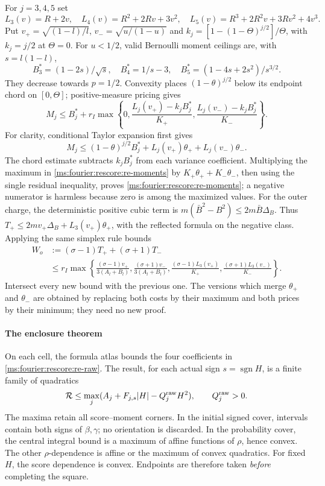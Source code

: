 For $j=3,4,5$ set
\[
 L_3(v)=R+2v,\quad L_4(v)=R^2+2Rv+3v^2,
 \quad L_5(v)=R^3+2R^2v+3Rv^2+4v^3.
\]
Put $v_+=\sqrt{(1-l)/l}$, $v_-=\sqrt{u/(1-u)}$ and
$k_j=[1-(1-\Theta)^{j/2}]/\Theta$, with $k_j=j/2$ at $\Theta=0$.
For $u<1/2$, valid Bernoulli moment ceilings are, with $s=l(1-l)$,
\[
 B_3^*=(1-2s)/\sqrt s,\quad B_4^*=1/s-3,
 \quad B_5^*=(1-4s+2s^2)/s^{3/2}.
\]
They decrease towards $p=1/2$. Convexity places $(1-\theta)^{j/2}$
below its endpoint chord on $[0,\Theta]$; positive-measure pricing gives
\begin{equation}\label{ms:fourier:rescore:re-moments}
 M_j\le B_j^*+r_I\max\left\{0,
 \frac{L_j(v_+)-k_jB_j^*}{K_+},
 \frac{L_j(v_-)-k_jB_j^*}{K_-}\right\}.
\end{equation}
For clarity, conditional Taylor expansion first gives
\[
 M_j\le(1-\theta)^{j/2}B_j^*
               +L_j(v_+)\theta_++L_j(v_-)\theta_-.
\]
The chord estimate subtracts $k_jB_j^*$ from each variance coefficient.
Multiplying the maximum in \eqref{ms:fourier:rescore:re-moments} by
$K_+\theta_++K_-\theta_-$, then using the single residual inequality,
proves \eqref{ms:fourier:rescore:re-moments}; a negative numerator is harmless because zero
is among the maximized values. For the outer charge, the deterministic
positive cubic term is
$m(\bar B^2-B^2)\le2m\bar B\Delta_B$.
Thus $T_+\le2mv_+\Delta_B+L_3(v_+)\theta_+$, with the reflected
formula on the negative class. Applying the same simplex rule bounds
\begin{equation}\label{ms:fourier:rescore:re-outerresource}
\begin{aligned}
 W_o&:=(\sigma-1)T_++(\sigma+1)T_-\\
 &\le r_I\max\left\{
 \frac{(\sigma-1)v_+}{3(A_l+B_l)},
 \frac{(\sigma+1)v_-}{3(A_l+B_l)},
 \frac{(\sigma-1)L_3(v_+)}{K_+},
 \frac{(\sigma+1)L_3(v_-)}{K_-}\right\}.
\end{aligned}
\end{equation}
Intersect every new bound with the previous one. The versions which
merge $\theta_+$ and $\theta_-$ are obtained by replacing both costs by
their maximum and both prices by their minimum; they need no new proof.

\paragraph{The enclosure theorem}\label{ms:fourier:rescore:re-operator}
On each cell, the formula atlas bounds the four coefficients in
\eqref{ms:fourier:rescore:re-raw}. The result, for each actual sign $s=\operatorname{sgn}H$,
is a finite family of quadratics
\begin{equation}\label{ms:fourier:rescore:re-quadratics}
 \mathcal R\le\max_j(A_j+F_{j,s}|H|-Q_j^{\rm raw}H^2),
 \qquad Q_j^{\rm raw}>0.
\end{equation}
The maxima retain all score--moment corners. In the initial signed
cover, intervals contain both signs of $\beta,\gamma$; no orientation is
discarded. In the probability cover, the central integral bound is a
maximum of affine functions of $\rho$, hence convex. The other
$\rho$-dependence is affine or the maximum of convex quadratics. For
fixed $H$, the score dependence is convex. Endpoints are therefore taken
\emph{before} completing the square.

